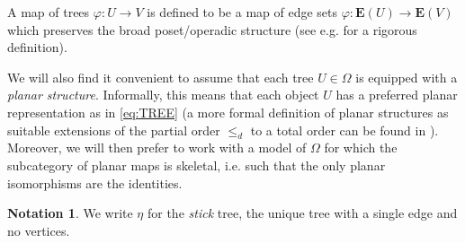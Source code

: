 \documentclass[a4paper,10pt
,draft
]{article}%
\numberwithin{equation}{section}
\numberwithin{figure}{section}
\theoremstyle{definition} %
\newtheorem{notation}[equation]{Notation}%
\newcommand{\1}{\ensuremath{\mathbbm 1}}%
\begin{document}
A map of trees $\varphi \colon U \to V$ is defined to be
a map of edge sets 
$\varphi \colon \boldsymbol{E}(U) \to \boldsymbol{E}(V)$
which preserves
{\color{blue} the broad poset/operadic structure}
(see e.g. \cite[\S 2.1]{BP_edss} for a rigorous definition).

We will also find it convenient to assume that 
each tree $U \in \Omega$ 
is equipped with a \textit{planar structure}.
Informally, 
this means that each object $U$
has a preferred planar representation as in \eqref{eq:TREE}
(a more formal definition of planar structures as
suitable extensions of the partial order $\leq_d$ to a total order
can be found in \cite[\S 3.1]{BP_geo}).
Moreover, we will then prefer to work with a model of $\Omega$
for which the subcategory of planar maps is skeletal,
i.e. such that the only planar isomorphisms are the identities.




\begin{notation}
      We write $\eta$ for the \textit{stick} tree, the unique tree with a single edge and no vertices.
\end{notation}
\end{document}
